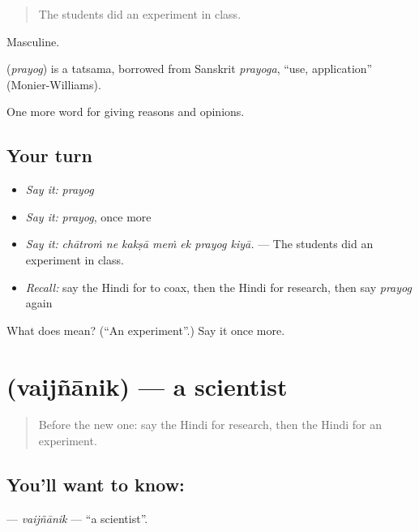 \begin{quote}
The students did an experiment in class.
\end{quote}

Masculine.

\begin{cousinweb}
\textbf{} (\emph{prayog}) is a tatsama, borrowed from Sanskrit \emph{prayoga}, \textquotedblleft{}use, application\textquotedblright{} (Monier-Williams).
\end{cousinweb}

\begin{grammarlens}[title={What you've built}]
One more word for giving reasons and opinions.
\end{grammarlens}

\subsection*{Your turn}
\begin{itemize}
\raggedright
  \item \emph{Say it:} \emph{prayog}
  \item \emph{Say it:} \emph{prayog}, once more
  \item \emph{Say it:} \emph{chātroṁ ne kakṣā meṁ ek prayog kiyā.} — The students did an experiment in class.
  \item \emph{Recall:} say the Hindi for to coax, then the Hindi for research, then say \emph{prayog} again
\end{itemize}

\begin{tcolorbox}[breakable,colback=teal!4,colframe=teal!35!black,title={Before you move on}]
What does  mean? (\textquotedblleft{}An experiment\textquotedblright{}.) Say it once more.
\end{tcolorbox}
\section[\texorpdfstring{\hi{वैज्ञानिक} (vaijñānik)}{वैज्ञानिक (vaijñānik)}]{ (vaijñānik) — a scientist}

\label{lesson:HI-C361-vaijnanik}



\begin{quote}
Before the new one: say the Hindi for research, then the Hindi for an experiment.
\end{quote}

\subsection*{You'll want to know: }
\textbf{} — \emph{vaijñānik} — \textquotedblleft{}a scientist\textquotedblright{}.

